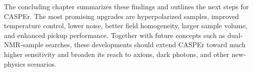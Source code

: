 The concluding chapter summarizes these findings and outlines the next steps for CASPEr.
The most promising upgrades are hyperpolarized samples, improved temperature control, lower noise, better field homogeneity, larger sample volume, and enhanced pickup performance.
Together with future concepts such as dual-NMR-sample searches, these developments should extend CASPEr toward much higher sensitivity and broaden its reach to axions, dark photons, and other new-physics scenarios.

